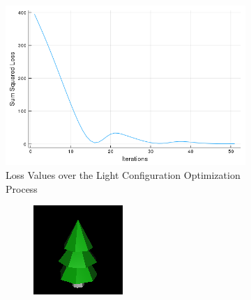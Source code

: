 \documentclass{juliacon}
\begin{document}
\begin{figure}[!htb]
    \centering
    \begin{subfigure}[b]{0.45\textwidth}
        \includegraphics[width=\linewidth]{images/light/loss_plot_light.png}
        \caption{Loss Values over the Light Configuration Optimization Process}
        \label{fig:loss_plot_light}
    \end{subfigure}
    \hfill
    \begin{subfigure}[b]{0.45\textwidth}
        \begin{subfigure}[b]{0.4\textwidth}
            \centering
            \includegraphics[width=\textwidth]{images/light/original.png}

\end{subfigure}
\end{subfigure}
\end{figure}
\end{document}
